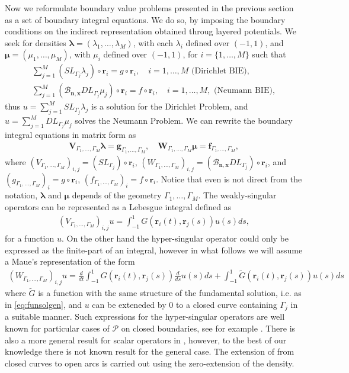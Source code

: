\documentclass{article}
\newcommand{\bmu} {\bm{\mu}}
\newcommand{\bg}{\bm{g}}
\newcommand{\bla}{\boldsymbol \lambda}
\newcommand{\bn}{\bm{n}}
\newcommand{\br}{\bm{r}}
\newcommand{\bx}{\bm{x}}
\begin{document}
Now we reformulate boundary value problems presented in the previous section as a set of boundary integral equations. We do so, by imposing the boundary conditions on the indirect representation obtained throug layered potentials. We seek for densities $\bla = (\lambda_1,\hdots,\lambda_M)$, with each $\lambda_i$ defined over $(-1,1)$, and $\bmu = (\mu_1, \hdots, \mu_M)$, with $\mu_i$ defined over $(-1,1)$, for $i = \{1,\hdots,M\}$ such that
\begin{align*}
\sum_{j=1}^M (SL_{\Gamma_j} \lambda_j )\circ \br_i = g\circ \br_i, \quad i = 1,\hdots,M \text{ (Dirichlet BIE)}, \\
\sum_{j=1}^M (\mathcal{B}_{\bn,\bx}DL_{\Gamma_j} \mu_j )\circ \br_i = f\circ \br_i, \quad i = 1,\hdots,M,
\text{ (Neumann BIE)},
\end{align*}
 thus $u = \sum_{j=1}^M SL_{\Gamma_j} \lambda_j $ is a solution for the Dirichlet Problem, and  $u = \sum_{j=1}^M DL_{\Gamma_j} \mu_j $ solves the Neumann Problem. We can rewrite the boundary integral equations in matrix form as 
\begin{align}
\label{eq:bios}
\mathbf{V}_{\Gamma_1,\hdots,\Gamma_M} \bla = \bg_{\Gamma_1,\hdots,\Gamma_M}, \quad \mathbf{W}_{\Gamma_1,\hdots,\Gamma_M} \bmu = \mathbf{f}_{\Gamma_1,\hdots,\Gamma_M},
\end{align}
where $(V_{\Gamma_1,\hdots,\Gamma_M})_{i,j} = (SL_{\Gamma_j}  )\circ \br_i$, $(W_{\Gamma_1,\hdots,\Gamma_M})_{i,j} = (\mathcal{B}_{\bn,\bx}DL_{\Gamma_j} )\circ \br_i$, and $(g_{\Gamma_1,\hdots,\Gamma_M})_i = g \circ \br_i$, $(f_{\Gamma_1,\hdots,\Gamma_M})_i = f \circ \br_i$. Notice that even is not direct from the notation, $\bla$ and $\bmu$ depends of the geometry $\Gamma_1,\hdots,\Gamma_M$. The weakly-singular operators can be represented as a Lebesgue integral defined as 
\begin{align*}
(V_{\Gamma_1,\hdots,\Gamma_M})_{i,j}u = \int_{-1}^1G(\br_i(t),\br_j(s)) u(s) ds,
\end{align*}
for a function $u$. On the other hand the hyper-singular operator could only be expressed as the finite-part of an integral, however in what follows we will assume a Maue's representation of the form 
\begin{align}
\label{eq:mauesrep}
(W_{\Gamma_1,\hdots,\Gamma_M})_{i,j}u =  \frac{d}{dt}\int_{-1}^1G(\br_i(t),\br_j(s)) \frac{d}{ds}u(s) ds + 
\int_{-1}^1\widetilde{G}(\br_i(t),\br_j(s))u(s) ds
\end{align} 
where $\widetilde{G}$ is a function with the same structure of the fundamental solution, i.e. as in \eqref{eq:funsolgen}, and $u$ can be exteneded by 0 to a closed curve containing $\Gamma_j$ in a suitable manner. Such expressions for the hyper-singular operators are well known for particular cases of $\mathcal{P}$ on closed boundaries, see for example \cite{Nedelec1982,Maue1949}. There is also a more general result for scalar operators in \cite[Chapter 3.3.4]{Sauter:2011}, however, to the best of our knowledge there is not known result for the general case. The extension of from closed curves to open arcs is carried out using the zero-extension of the density. 
\end{document}
